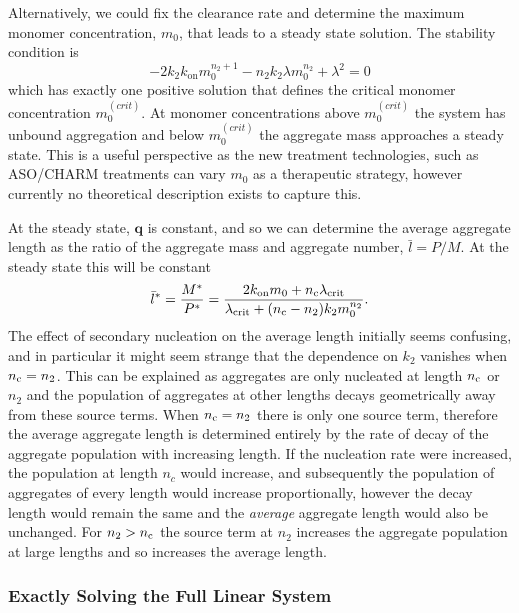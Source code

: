 Alternatively, we could fix the clearance rate and determine the maximum monomer concentration, $m_0$, that leads to a steady state solution. The stability condition is
\begin{equation}
    -2 k_2 k_\text{on} m_0^{n_2+1} - n_2 k_2 \lambda m_0^{n_2} +\lambda^2 = 0
    \label{eq:2-critmon}
\end{equation}
which has exactly one positive solution that defines the critical monomer concentration $m_0^{(crit)}$. At monomer concentrations above $m_0^{(crit)}$ the system has unbound aggregation and below $m_0^{(crit)}$ the aggregate mass approaches a steady state. This is a useful perspective as the new treatment technologies, such as ASO/CHARM treatments can vary $m_0$ as a therapeutic strategy, however currently no theoretical description exists to capture this.

At the steady state, $\textbf{q}$ is constant, and so we can determine the average aggregate length as the ratio of the aggregate mass and aggregate number, $\bar{l}=P/M$. At the steady state this will be constant
\begin{equation}
    \bar{l}^* = \frac{M^*}{P^*} = \frac{2 k_\text{on} m_0 + n_{\mathrm{c}} \lambda_{\text{crit}}}{\lambda_{\text{crit}}+(n_{\mathrm{c}}-n_2)k_2 m_0^{n_2}}.
    \label{eq:4-lbarConstClear}
\end{equation}
The effect of secondary nucleation on the average length initially seems confusing, and in particular it might seem strange that the dependence on $k_2$ vanishes when $n_{\mathrm{c}}=n_2$. This can be explained as aggregates are only nucleated at length $n_{\mathrm{c}}$ or $n_2$ and the population of aggregates at other lengths decays geometrically away from these source terms. When $n_{\mathrm{c}} = n_2$ there is only one source term, therefore the average aggregate length is determined entirely by the rate of decay of the aggregate population with increasing length. If the nucleation rate were increased, the population at length $n_c$ would increase, and subsequently the population of aggregates of every length would increase proportionally, however the decay length would remain the same and the \textit{average} aggregate length would also be unchanged. For $n_2>n_{\mathrm{c}}$ the source term at $n_2$ increases the aggregate population at large lengths and so increases the average length.

\subsubsection{Exactly Solving the Full Linear System}

